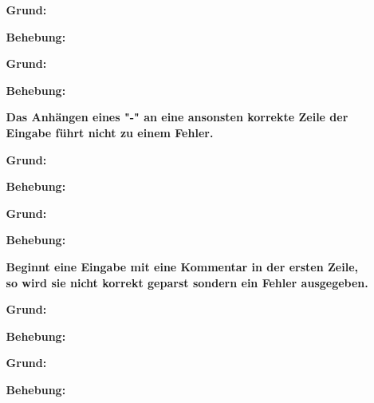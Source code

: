 \documentclass[parskip=full,11pt,openany]{scrreprt}
\begin{document}
\begin{itemize}[itemsep=3ex]

\item[] %
\begin{itemize}[noitemsep]
\item[] {\bfseries }
\item [\textbf{Grund:}]
\item [\textbf{Behebung:}]
\end{itemize}

\item[] %
\begin{itemize}[noitemsep]
\item[] {\bfseries }
\item [\textbf{Grund:}]
\item [\textbf{Behebung:}]
\end{itemize}

\item[] %
\begin{itemize}[noitemsep]
\item[] {\bfseries  Das Anhängen eines "-" an eine ansonsten korrekte Zeile der Eingabe führt nicht zu einem Fehler. }
\item [\textbf{Grund:}]
\item [\textbf{Behebung:}]
\end{itemize}

\item[] %
\begin{itemize}[noitemsep]
\item[] {\bfseries  }
\item [\textbf{Grund:}]
\item [\textbf{Behebung:}]
\end{itemize}

\item[] %
\begin{itemize}[noitemsep]
\item[] {\bfseries  Beginnt eine Eingabe mit eine Kommentar in der ersten Zeile, so wird sie nicht korrekt geparst sondern ein Fehler ausgegeben. }
\item [\textbf{Grund:}]
\item [\textbf{Behebung:}]
\end{itemize}

\item[] %
\begin{itemize}[noitemsep]
\item[] {\bfseries  }
\item [\textbf{Grund:}]
\item [\textbf{Behebung:}]
\end{itemize}


\end{itemize}
\end{document}
